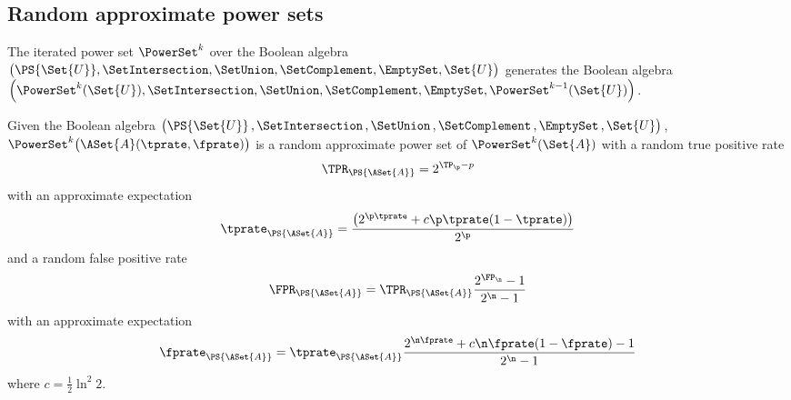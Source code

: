 \documentclass[ ../main.tex]{subfiles}
\begin{document}
\subsection{Random approximate power sets}
The iterated power set $\PowerSet^{k}$ over the Boolean algebra
$\left(
\PS{\Set{U}},\SetIntersection,\SetUnion,\SetComplement,\EmptySet,\Set{U}
\right)
$
generates the Boolean algebra
$\left(
\PowerSet^k(\Set{U}),\SetIntersection,\SetUnion,\SetComplement,\EmptySet,\PowerSet^{k-1}(\Set{U})
\right)$.

\begin{theorem}
	Given the Boolean algebra $\left(\PS{\Set{U}}\,,\SetIntersection\,,\SetUnion\,,\SetComplement\,,\EmptySet\,,\Set{U}\right)$, $\PowerSet^{k}\!\left(\ASet{A}(\tprate,\fprate)\right)$ is a random approximate power set of $\PowerSet^k(\Set{A})$ with a random true positive rate
	\begin{equation}
		\TPR_{\PS{\ASet{A}}} = 2^{\TP_\p - p}
	\end{equation}
	with an approximate expectation
	\begin{equation}
		\tprate_{\PS{\ASet{A}}} = \frac{\left(2^{\p \tprate}+c\p\tprate(1-\tprate)\right)}{2^\p}
	\end{equation}
	and a random false positive rate
	\begin{equation}
		\FPR_{\PS{\ASet{A}}} = \TPR_{\PS{\ASet{A}}} \frac{2^{\FP_\n} - 1}{2^\n-1}
	\end{equation}
	with an approximate expectation
	\begin{equation}
		\fprate_{\PS{\ASet{A}}} = \tprate_{\PS{\ASet{A}}} \frac{2^{\n \fprate}+c\n\fprate(1-\fprate)-1}{2^\n-1}
	\end{equation}
	where $c = \frac{1}{2} \ln^2 2$.
\end{theorem}
\end{document}
